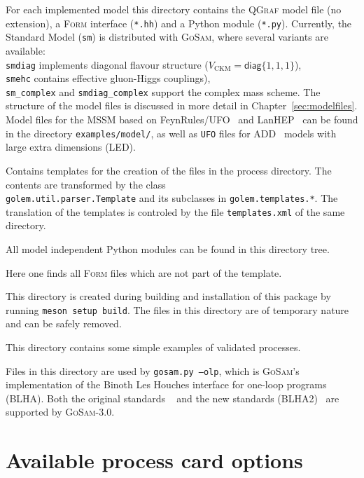 \documentclass[11pt,a4paper]{refrep}
\newcommand{\gosamversion}{{3{.}0}}
\newcommand{\gosam}{\textsc{GoSam}\xspace}
\newcommand{\gosamv}[1][\gosamversion]{\textsc{GoSam}\xspace}
\newcommand{\qgraf}{\textsc{QGraf}\xspace}
\newcommand{\form}{\textsc{Form}\xspace}
\newcommand{\python}{{Python}\xspace}
\begin{document}
 For each implemented model this directory
contains the \qgraf model file (no extension), a \form interface
(\texttt{*.hh}) and a \python module (\texttt{*.py}). Currently,
the Standard Model (\texttt{sm}) is distributed with \gosamv, 
where several variants are available:\\
\texttt{smdiag} implements
diagonal flavour structure ($V_{\text{CKM}}=\mathsf{diag}\{1,1,1\}$),\\
{\tt smehc} contains effective gluon-Higgs couplings),\\
\texttt{sm\_complex} and \texttt{smdiag\_complex} support the complex mass scheme. 
The structure of the model files is discussed in more detail in
Chapter~\ref{sec:modelfiles}. Model files for the MSSM based on 
FeynRules/UFO~\cite{Degrande:2011ua}  and LanHEP~\cite{Semenov:2010qt}
can be found in the directory 
\texttt{examples/model/}, as well as {\tt UFO}  files for ADD~\cite{ArkaniHamed:1998rs}
models with large extra dimensions (LED).

 Contains templates for the creation
of the files in the process directory. The contents are transformed
by the class\\
\texttt{golem.util.parser.Template} and its subclasses
in \texttt{golem.templates.*}. The translation of the templates is
controled by the file \texttt{templates.xml} of the same directory.

 All model independent \python modules
can be found in this directory tree.

 Here one finds all \form files
which are not part of the template.

 This directory is created during
building and installation of this package by running \texttt{meson setup build}.
The files in this directory are of temporary nature and can be safely
removed.

 This directory contains some simple examples
of validated processes.

 Files in this directory are used by
\texttt{gosam.py --olp}, which is \gosamv's implementation of the
Binoth Les Houches interface for one-loop programs (BLHA).
Both the original standards ~\cite{Binoth:2010xt} and the new standards 
(BLHA2)~\cite{Alioli:2013nda} are supported by \gosam-\gosamversion.

\chapter{Available process card options} \label{chp:process_card_options}
\begin{adjustwidth}{-100pt}{0pt}

\end{adjustwidth}
\end{document}
